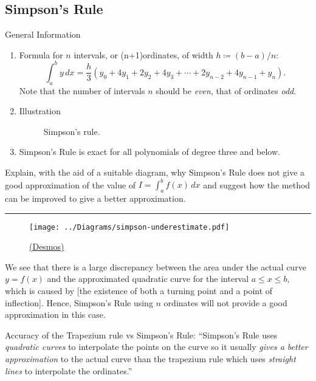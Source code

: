 \documentclass[oneside]{book}
\begin{document}
    \subsection{Simpson's Rule}
    \begin{stbox}{General Information}
      \begin{enumerate}
        \item Formula for \(n\) intervals, or (n+1)ordinates, of width \(h\coloneq (b-a)/n\):
        \[\int_{a}^{b}y\,dx=\frac{h}{3}(y_0+4y_1+2y_2+4y_3+\cdots+2y_{n-2}+4y_{n-1}+y_n).\]
        Note that the number of intervals \(n\) should be \emph{even}, that of ordinates \emph{odd}.
        \item Illustration
        \begin{figure}[H]
          \centering
          
          \caption{Simpson's rule.}
          \label{fig:simpson's-rule}
        \end{figure}
        \item Simpson's Rule is exact for all polynomials of degree three and below.
      \end{enumerate}
    \end{stbox}
    \begin{example}{}{}
      Explain, with the aid of a suitable diagram, why Simpson's Rule does not give a good approximation of the value of \(I=\int_{a}^{b}f(x)\,dx\) and suggest how the method can be improved to give a better approximation.

      \rule{20cm-137.0549pt-25pt}{0.05mm}

      \begin{figure}[H]
        \centering
        \texttt{[image: ../Diagrams/simpson-underestimate.pdf]}
        \caption{\href{https://www.desmos.com/calculator/wxxs9ypjkf}{(Desmos)}}
        \label{fig:simpson's-rule-overestimate-prelims}
      \end{figure}
      We see that there is a large discrepancy between the area under the actual curve \(y=f(x)\) and the approximated quadratic curve for the interval \(a\leq x\leq b\), which is caused by [the existence of both a turning point and a point of inflection]. Hence, Simpson's Rule using \(n\) ordinates will not provide a good approximation in this case.
    \end{example}
    \begin{note}
      Accuracy of the Trapezium rule vs Simpson's Rule:
      ``Simpson's Rule uses \emph{quadratic curves} to interpolate the points on the curve so it usually \emph{gives a better approximation} to the actual curve than the trapezium rule which uses \emph{straight lines} to interpolate the ordinates.''
    \end{note}
\end{document}

